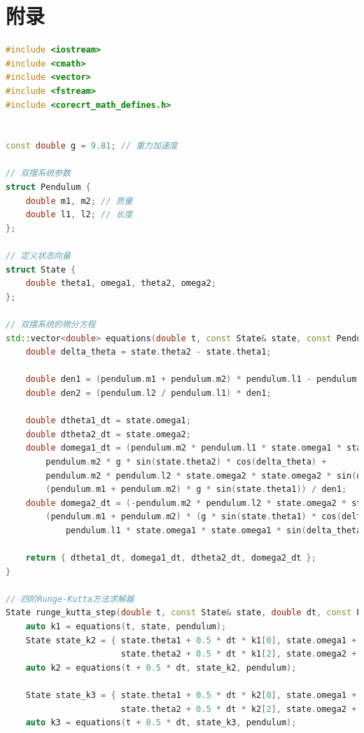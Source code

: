 \documentclass[12pt, a4paper, oneside]{article}
\begin{document}
\section{附录}
\begin{lstlisting}[language = C++, name = double_pendulum_main.cpp]
	#include <iostream>
#include <cmath>
#include <vector>
#include <fstream>
#include <corecrt_math_defines.h>


const double g = 9.81; // 重力加速度

// 双摆系统参数
struct Pendulum {
    double m1, m2; // 质量
    double l1, l2; // 长度
};

// 定义状态向量
struct State {
    double theta1, omega1, theta2, omega2;
};

// 双摆系统的微分方程
std::vector<double> equations(double t, const State& state, const Pendulum& pendulum) {
    double delta_theta = state.theta2 - state.theta1;

    double den1 = (pendulum.m1 + pendulum.m2) * pendulum.l1 - pendulum.m2 * pendulum.l1 * cos(delta_theta) * cos(delta_theta);
    double den2 = (pendulum.l2 / pendulum.l1) * den1;

    double dtheta1_dt = state.omega1;
    double dtheta2_dt = state.omega2;
    double domega1_dt = (pendulum.m2 * pendulum.l1 * state.omega1 * state.omega1 * sin(delta_theta) * cos(delta_theta) +
        pendulum.m2 * g * sin(state.theta2) * cos(delta_theta) +
        pendulum.m2 * pendulum.l2 * state.omega2 * state.omega2 * sin(delta_theta) -
        (pendulum.m1 + pendulum.m2) * g * sin(state.theta1)) / den1;
    double domega2_dt = (-pendulum.m2 * pendulum.l2 * state.omega2 * state.omega2 * sin(delta_theta) * cos(delta_theta) +
        (pendulum.m1 + pendulum.m2) * (g * sin(state.theta1) * cos(delta_theta) -
            pendulum.l1 * state.omega1 * state.omega1 * sin(delta_theta) - g * sin(state.theta2))) / den2;

    return { dtheta1_dt, domega1_dt, dtheta2_dt, domega2_dt };
}

// 四阶Runge-Kutta方法求解器
State runge_kutta_step(double t, const State& state, double dt, const Pendulum& pendulum) {
    auto k1 = equations(t, state, pendulum);
    State state_k2 = { state.theta1 + 0.5 * dt * k1[0], state.omega1 + 0.5 * dt * k1[1],
                       state.theta2 + 0.5 * dt * k1[2], state.omega2 + 0.5 * dt * k1[3] };
    auto k2 = equations(t + 0.5 * dt, state_k2, pendulum);

    State state_k3 = { state.theta1 + 0.5 * dt * k2[0], state.omega1 + 0.5 * dt * k2[1],
                       state.theta2 + 0.5 * dt * k2[2], state.omega2 + 0.5 * dt * k2[3] };
    auto k3 = equations(t + 0.5 * dt, state_k3, pendulum);


\end{lstlisting}
\end{document}
